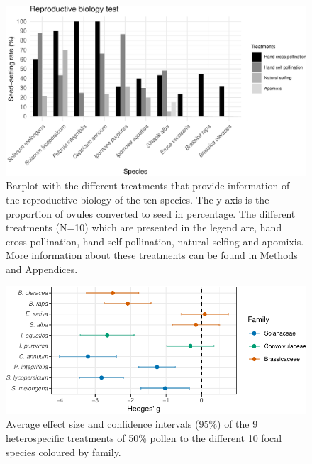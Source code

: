 \documentclass[11pt,a4paper]{article}
\begin{document}
\newpage

\begin{figure}

{\centering \includegraphics{output/figures/unnamed-chunk-3-1} 

}

\caption{Barplot with the different treatments that provide information of the reproductive biology of the ten species. The y axis is the proportion of ovules converted to seed in percentage. The different treatments (N=10) which are presented in the legend are, hand cross-pollination, hand self-pollination, natural selfing and apomixis. More information about these treatments can be found in Methods and Appendices.}\label{fig:unnamed-chunk-3}
\end{figure}

\newpage

\begin{figure}
\centering
\includegraphics{output/figures/unnamed-chunk-4-1.pdf}
\caption{Average effect size and confidence intervals (95\%) of the 9
heterospecific treatments of 50\% pollen to the different 10 focal
species coloured by family.}
\end{figure}

\newpage
\end{document}
